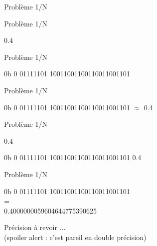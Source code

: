 \documentclass{beamer}
\begin{document}
    \begin{frame}{Problème 1/N} 
    \begin{center}
      \fontsize{100}{110}\selectfont{$0.4$}
    \end{center}
  \end{frame}
  
  \begin{frame}{Problème 1/N} 
    \begin{center}
      \fontsize{100}{110}\selectfont{$0.4$}
    \end{center}
    \begin{center}
      0.4
    \end{center}
  \end{frame}
  
  \begin{frame}{Problème 1/N} 
    \begin{center}
      \fontsize{100}{110}\selectfont{$0.4$}
    \end{center}
    \begin{center}
      0b \textcolor{SignColor}{0} \textcolor{ExponentColor}{01111101} \textcolor{FractionColor}{10011001100110011001101}
    \end{center}
  \end{frame}
  
  \begin{frame}{Problème 1/N} 
    \begin{center}
      \fontsize{100}{110}\selectfont{$0.4$}
    \end{center}
    \begin{center}
      0b \textcolor{SignColor}{0} \textcolor{ExponentColor}{01111101} \textcolor{FractionColor}{10011001100110011001101} $\approx$ 0.4
    \end{center}
  \end{frame}
  
  \begin{frame}{Problème 1/N} 
    \begin{center}
      \fontsize{100}{110}\selectfont $0.4$
    \end{center}
    \begin{center}
      0b \textcolor{SignColor}{0} \textcolor{ExponentColor}{01111101} \textcolor{FractionColor}{10011001100110011001101} \fontsize{40}{50}\selectfont{$\approx$} 0.4
    \end{center}
  \end{frame}
  
  \begin{frame}{Problème 1/N} 
    \begin{center}
      \Large 0b \textcolor{SignColor}{0} \textcolor{ExponentColor}{01111101} \textcolor{FractionColor}{10011001100110011001101} \\
      = \\
      0.4000000059604644775390625
    \end{center}
    \begin{center}
    Précision à revoir ... \\
    (spoiler alert : c'est pareil en double précision)
    \end{center}
  \end{frame}
 
\end{document}
